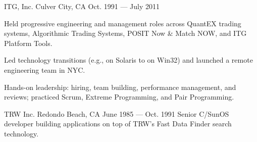 \begin{cventries}

    {ITG, Inc.} %
    {Culver City, CA} %
    {Oct. 1991 --- July 2011} %
    {%
      \begin{cvitems}
        \item {Held progressive engineering and management roles across QuantEX trading systems, Algorithmic Trading Systems, POSIT Now \& Match NOW, and ITG Platform Tools.}
        \item {Led technology transitions (e.g., \CC{} on Solaris to \CS{} on Win32) and launched a remote engineering team in NYC.}
        \item {Hands-on leadership: hiring, team building, performance management, and reviews; practiced Scrum, Extreme Programming, and Pair Programming.}
      \end{cvitems}
    }

    {TRW Inc.} %
    {Redondo Beach, CA} %
    {June 1985 --- Oct. 1991} %
    {Senior C/SunOS developer building applications on top of TRW's Fast Data Finder search technology.}

\end{cventries}
